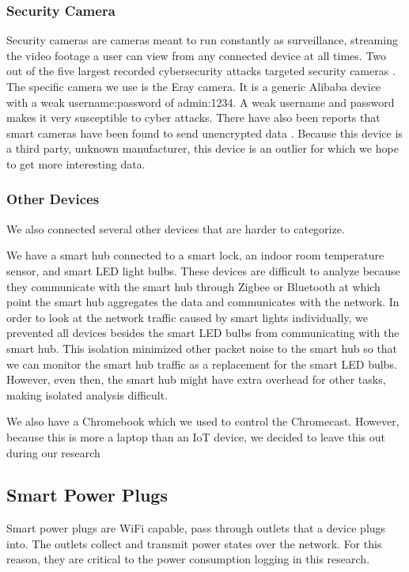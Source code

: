 \subsubsection{Security Camera}

Security cameras are cameras meant to run constantly as surveillance, streaming the video footage a user can view from any connected device at all times. Two out of the five largest recorded cybersecurity attacks targeted security cameras \cite{guest_2018}. The specific camera we use is the Eray camera. It is a generic Alibaba device with a weak username:password of admin:1234. A weak username and password makes it very susceptible to cyber attacks. There have also been reports that smart cameras have been found to send unencrypted data \cite{feamster_2016}. Because this device is a third party, unknown manufacturer, this device is an outlier for which we hope to get more interesting data.

\subsubsection{Other Devices}

We also connected several other devices that are harder to categorize.

We have a smart hub connected to a smart lock, an indoor room temperature sensor, and smart LED light bulbs. These devices are difficult to analyze because they communicate with the smart hub through Zigbee or Bluetooth at which point the smart hub aggregates the data and communicates with the network. In order to look at the network traffic caused by smart lights individually, we prevented all devices besides the smart LED bulbs from communicating with the smart hub. This isolation minimized other packet noise to the smart hub so that we can monitor the smart hub traffic as a replacement for the smart LED bulbs. However, even then, the smart hub might have extra overhead for other tasks, making isolated analysis difficult.

We also have a Chromebook which we used to control the Chromecast. However, because this is more a laptop than an IoT device, we decided to leave this out during our research

\subsection{Smart Power Plugs}

Smart power plugs are WiFi capable, pass through outlets that a device plugs into. The outlets collect and transmit power states over the network. For this reason, they are critical to the power consumption logging in this research.

